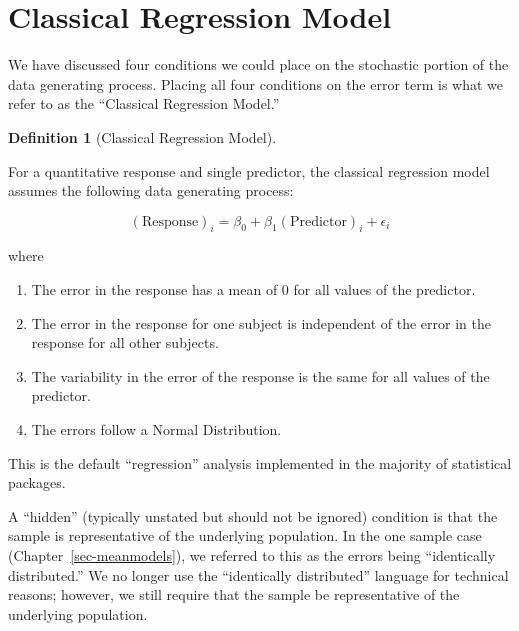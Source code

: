 \documentclass[
  letterpaper,
  DIV=11,
  numbers=noendperiod]{scrreprt}
\providecommand{\tightlist}{%
  \setlength{\itemsep}{0pt}\setlength{\parskip}{0pt}}\usepackage{longtable,booktabs,array}
\theoremstyle{plain}
\theoremstyle{definition}
\theoremstyle{definition}
\newtheorem{definition}{Definition}[chapter]
\theoremstyle{remark}
\begin{document}
\section{Classical Regression Model}\label{classical-regression-model}

We have discussed four conditions we could place on the stochastic
portion of the data generating process. Placing all four conditions on
the error term is what we refer to as the ``Classical Regression
Model.''

\begin{definition}[Classical Regression
Model]\protect\hypertarget{def-classical-regression}{}\label{def-classical-regression}

For a quantitative response and single predictor, the classical
regression model assumes the following data generating process:

\[(\text{Response})_i = \beta_0 + \beta_1 (\text{Predictor})_{i} + \epsilon_i\]

where

\begin{enumerate}
\def\labelenumi{\arabic{enumi}.}
\tightlist
\item
  The error in the response has a mean of 0 for all values of the
  predictor.
\item
  The error in the response for one subject is independent of the error
  in the response for all other subjects.
\item
  The variability in the error of the response is the same for all
  values of the predictor.
\item
  The errors follow a Normal Distribution.
\end{enumerate}

This is the default ``regression'' analysis implemented in the majority
of statistical packages.

\end{definition}

\begin{tcolorbox}[enhanced jigsaw, breakable, titlerule=0mm, colframe=quarto-callout-warning-color-frame, bottomtitle=1mm, opacityback=0, rightrule=.15mm, toptitle=1mm, arc=.35mm, bottomrule=.15mm, left=2mm, title=\textcolor{quarto-callout-warning-color}{\faExclamationTriangle}\hspace{0.5em}{Warning}, leftrule=.75mm, coltitle=black, toprule=.15mm, colbacktitle=quarto-callout-warning-color!10!white, colback=white, opacitybacktitle=0.6]

A ``hidden'' (typically unstated but should not be ignored) condition is
that the sample is representative of the underlying population. In the
one sample case (Chapter~\ref{sec-meanmodels}), we referred to this as
the errors being ``identically distributed.'' We no longer use the
``identically distributed'' language for technical reasons; however, we
still require that the sample be representative of the underlying
population.

\end{tcolorbox}
\end{document}
